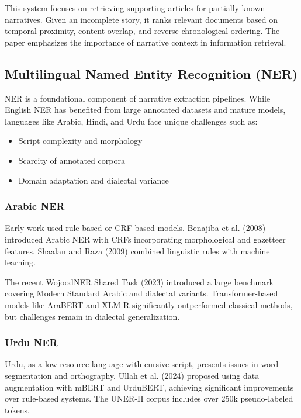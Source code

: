 \documentclass[12pt]{article}
\begin{document}
This system focuses on retrieving supporting articles for partially known narratives. Given an incomplete story, it ranks relevant documents based on temporal proximity, content overlap, and reverse chronological ordering. The paper emphasizes the importance of narrative context in information retrieval.

\subsection{Multilingual Named Entity Recognition (NER)}

NER is a foundational component of narrative extraction pipelines. While English NER has benefited from large annotated datasets and mature models, languages like Arabic, Hindi, and Urdu face unique challenges such as:
\begin{itemize}
    \item Script complexity and morphology
    \item Scarcity of annotated corpora
    \item Domain adaptation and dialectal variance
\end{itemize}

\subsubsection{Arabic NER}

Early work used rule-based or CRF-based models. Benajiba et al. (2008) introduced Arabic NER with CRFs incorporating morphological and gazetteer features. Shaalan and Raza (2009) combined linguistic rules with machine learning.

The recent WojoodNER Shared Task (2023) introduced a large benchmark covering Modern Standard Arabic and dialectal variants. Transformer-based models like AraBERT and XLM-R significantly outperformed classical methods, but challenges remain in dialectal generalization.

\subsubsection{Urdu NER}

Urdu, as a low-resource language with cursive script, presents issues in word segmentation and orthography. Ullah et al. (2024) proposed using data augmentation with mBERT and UrduBERT, achieving significant improvements over rule-based systems. The UNER-II corpus includes over 250k pseudo-labeled tokens.
\end{document}

